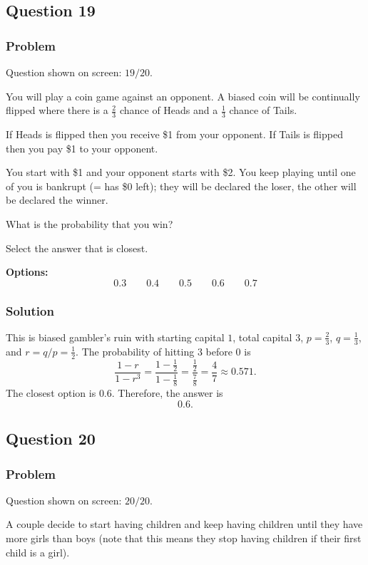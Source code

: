 \documentclass[12pt]{article}
\begin{document}
\subsection{Question 19}
\subsubsection{Problem}
Question shown on screen: \(19/20\).

You will play a coin game against an opponent. A biased coin will be continually flipped where there is a \(\frac{2}{3}\) chance of Heads and a \(\frac{1}{3}\) chance of Tails.

If Heads is flipped then you receive \$1 from your opponent. If Tails is flipped then you pay \$1 to your opponent.

You start with \$1 and your opponent starts with \$2. You keep playing until one of you is bankrupt (= has \$0 left); they will be declared the loser, the other will be declared the winner.

What is the probability that you win?

Select the answer that is closest.

\noindent\textbf{Options:}
\[
\boxed{0.3}
\qquad
\boxed{0.4}
\qquad
\boxed{0.5}
\qquad
\boxed{0.6}
\qquad
\boxed{0.7}
\]

\subsubsection{Solution}
This is biased gambler's ruin with starting capital \(1\), total capital \(3\), \(p=\frac{2}{3}\), \(q=\frac{1}{3}\), and \(r=q/p=\frac{1}{2}\). The probability of hitting \(3\) before \(0\) is
\[
\frac{1-r}{1-r^3}
=
\frac{1-\frac{1}{2}}{1-\frac{1}{8}}
=
\frac{\frac{1}{2}}{\frac{7}{8}}
=
\frac{4}{7}
\approx 0.571.
\]
The closest option is \(0.6\). Therefore, the answer is
\[
\boxed{0.6}.
\]

\subsection{Question 20}
\subsubsection{Problem}
Question shown on screen: \(20/20\).

A couple decide to start having children and keep having children until they have more girls than boys (note that this means they stop having children if their first child is a girl).
\end{document}
